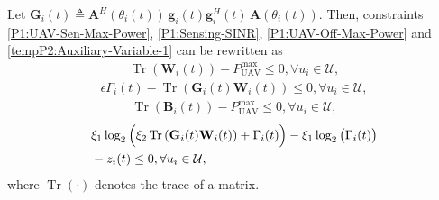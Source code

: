 \documentclass[10pt,journal,compsoc]{IEEEtran}
\begin{document}
Let $\mathbf{G}_{i}(t) \triangleq \mathbf{A}^{H}(\theta_{i}(t))\,\bm{g}_{i}(t)\bm{g}^{H}_{i}(t)\,\mathbf{A}(\theta_{i}(t))$. Then, constraints \eqref{P1:UAV-Sen-Max-Power}, \eqref{P1:Sensing-SINR}, \eqref{P1:UAV-Off-Max-Power} and \eqref{tempP2:Auxiliary-Variable-1} can be rewritten as
\begin{align}\label{P2:UAV-Sen-Max-Power}
    \operatorname{Tr}\left(\mathbf{W}_{i}(t)\right) - P^{\max}_{\text{UAV}} \le 0, \forall u_{i} \in \mathcal{U},
\end{align}
\begin{align}\label{P2:Sensing-SINR}
    \epsilon\Gamma_{i}(t) - \operatorname{Tr}\left(\mathbf{G}_{i}(t)\mathbf{W}_{i}(t)\right) \le 0, \forall u_{i} \in \mathcal{U},
\end{align}
\begin{align}\label{P2:UAV-Off-Max-Power}
    \operatorname{Tr}\left(\mathbf{B}_{i}(t)\right) - P^{\max}_{\text{UAV}} \le 0,  \forall u_{i} \in \mathcal{U},
\end{align}
\begin{align}\label{P2:Auxiliary-Variable-1}
    & \xi_{1} \log_2 \Big(\xi_{2} \operatorname{Tr} \left( \mathbf{G}_{i}(t)\mathbf{W}_{i}(t) \right) + \Gamma_{i}(t) \Big) - \xi_{1} \log_2 \big(\Gamma_{i}(t)\big) \notag \\
    & - z_{i}(t) \le 0, \forall u_{i} \in \mathcal{U},
\end{align}
where $\operatorname{Tr}\left(\cdot\right)$ denotes the trace of a matrix.
\end{document}
